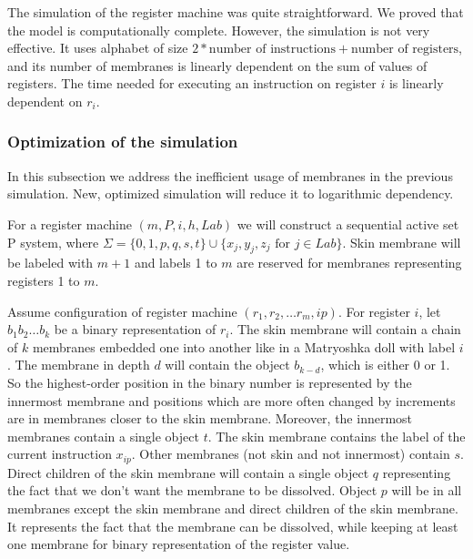     The simulation of the register machine was quite straightforward. We proved that the model is computationally complete. However, the simulation is not very effective. It uses alphabet of size $2 * \text{number of instructions} + \text{number of registers}$, and its number of membranes is linearly dependent on the sum of values of registers. The time needed for executing an instruction on register $i$ is linearly dependent on $r_i$.


  \subsubsection{Optimization of the simulation} %
  \label{ssub:optimization_of_the_simulation}
    In this subsection we address the inefficient usage of membranes in the previous simulation. New, optimized simulation will reduce it to logarithmic dependency.

    For a register machine $(m,P,i,h,Lab)$ we will construct a sequential active set P system, where $\Sigma = \{0,1,p,q,s,t\}\cup\{x_j, y_j, z_j \text{~for~} j\in Lab\}$. Skin membrane will be labeled with $m+1$ and labels 1 to $m$ are reserved for membranes representing registers 1 to $m$.

    Assume configuration of register machine $(r_1, r_2, \ldots r_m, ip)$. For register $i$, let $b_1b_2\ldots b_k$ be a binary representation of $r_i$. The skin membrane will contain a chain of $k$ membranes embedded one into another like in a Matryoshka doll with label $i$.
    The membrane in depth $d$ will contain the object $b_{k-d}$, which is either 0 or 1. So the highest-order position in the binary number is represented by the innermost membrane and positions which are more often changed by increments are in membranes closer to the skin membrane. Moreover, the innermost membranes contain a single object $t$. The skin membrane contains the label of the current instruction $x_{ip}$. Other membranes (not skin and not innermost) contain $s$. Direct children of the skin membrane will contain a single object $q$ representing the fact that we don't want the membrane to be dissolved. Object $p$ will be in all membranes except the skin membrane and direct children of the skin membrane. It represents the fact that the membrane can be dissolved, while keeping at least one membrane for binary representation of the register value.

